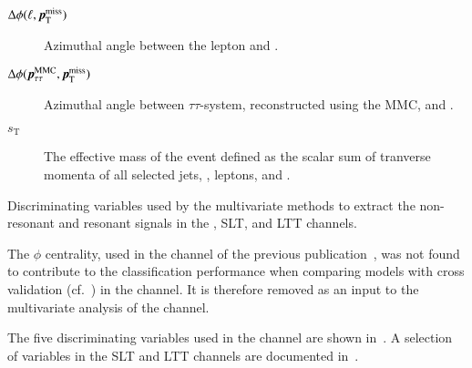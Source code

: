 \begin{description}
\item[$\Delta\phi(\ell, \pTmiss)$] Azimuthal angle between the lepton
  and \pTmiss.

\item[$\Delta\phi(\pTauTau, \pTmiss)$] Azimuthal angle between
  $\tau\tau$-system, reconstructed using the MMC, and \pTmiss.

\item[$s_{\text{T}}$] The effective mass of the event defined as the
  scalar sum of tranverse momenta of all selected jets, \tauhadvis,
  leptons, and \pTmissAbs.
\end{description}

\begin{table}[htbp]
  \centering

  

  \caption{Discriminating variables used by the multivariate methods
    to extract the non-resonant and resonant \HH signals in the
    \hadhad, \lephad SLT, and \lephad LTT channels.}
  \label{tab:mva_inputvar}
\end{table}

The \pTmiss $\phi$ centrality, used in the \hadhad channel of the
previous publication~\cite{HIGG-2016-16-witherratum}, was not found to
contribute to the classification performance when comparing models
with cross validation (cf.~) in the
\hadhad channel. It is therefore removed as an input to the
multivariate analysis of the \hadhad channel.

The five discriminating variables used in the \hadhad channel are
shown in~. A selection of variables in the
\lephad SLT and LTT channels are documented
in~\cite{ATLAS-CONF-2021-030}.

